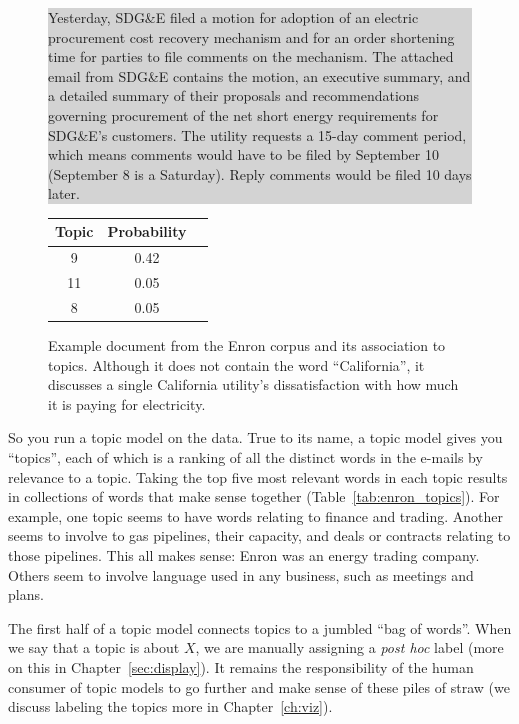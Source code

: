\begin{figure}

\begin{center}
\colorbox{lightgray}{ \parbox{.9\linewidth}{ \small
Yesterday, SDG\&E filed a motion for adoption of an
electric procurement cost recovery mechanism and for an order
shortening time for parties to file comments on the mechanism. The
attached email from SDG\&E contains the motion, an executive summary,
and a detailed summary of their proposals and recommendations
governing procurement of the net short energy requirements for
SDG\&E's customers. The utility requests a 15-day comment period, which
means comments would have to be filed by September 10 (September 8
is a Saturday). Reply comments would be filed 10 days later.}}

\begin{tabular}{ccl}
  Topic & Probability \\
  \hline
  9 & 0.42  \\
  11 & 0.05 \\
  8 & 0.05 \\
  \hline
\end{tabular}
\end{center}
  \caption{Example document from the Enron corpus and its association
    to topics.  Although it does not contain the word ``California'',
    it discusses a single California utility's dissatisfaction with how
    much it is paying for electricity.}
  \label{fig:enron_doc}
\end{figure}


So you run a topic model on the data.  True to its name, a topic model
gives you ``topics'', each of which is a ranking of all the distinct words in the e-mails by relevance to a topic. Taking the top five most relevant words in each topic results in collections of words that make sense together (Table~\ref{tab:enron_topics}).
For example, one topic seems to have words relating to finance and trading.
Another seems to involve to gas pipelines, their capacity, and deals or contracts relating to those pipelines.
This all makes sense: Enron was an energy trading company.
Others seem to involve language used in any business, such as meetings and plans.


The first half of a topic model connects topics to a jumbled ``bag of words''.
When we say that a topic is about $X$, we are manually assigning a \textit{post hoc} label
 (more on this in Chapter~\ref{sec:display}).
It remains the responsibility of the human consumer of topic models to go further and
make sense of these piles of straw (we discuss labeling the topics
more in Chapter~\ref{ch:viz}).


